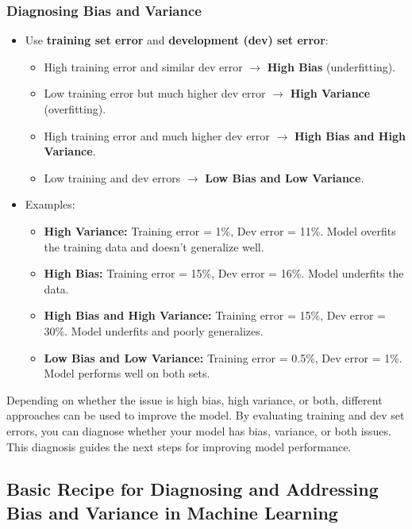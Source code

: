 \documentclass[letterpaper,12pt,notitlepage,twoside]{report}
\begin{document}
\subsubsection*{Diagnosing Bias and Variance}
\begin{itemize}[leftmargin=*]
    \item Use \textbf{training set error} and \textbf{development (dev) set error}:
    \begin{itemize}
        \item High training error and similar dev error $\rightarrow$ \textbf{High Bias} (underfitting).
        \item Low training error but much higher dev error $\rightarrow$ \textbf{High Variance} (overfitting).
        \item High training error and much higher dev error $\rightarrow$ \textbf{High Bias and High Variance}.
        \item Low training and dev errors $\rightarrow$ \textbf{Low Bias and Low Variance}.
    \end{itemize}
    \item Examples:
	\begin{itemize}
	    \item \textbf{High Variance:} Training error = 1\%, Dev error = 11\%. Model overfits the training data and doesn’t generalize well.
	    \item \textbf{High Bias:} Training error = 15\%, Dev error = 16\%. Model underfits the data.
	    \item \textbf{High Bias and High Variance:} Training error = 15\%, Dev error = 30\%. Model underfits and poorly generalizes.
	    \item \textbf{Low Bias and Low Variance:} Training error = 0.5\%, Dev error = 1\%. Model performs well on both sets.
	\end{itemize}
\end{itemize}

Depending on whether the issue is high bias, high variance, or both, different approaches can be used to improve the model. By evaluating training and dev set errors, you can diagnose whether your model has bias, variance, or both issues. This diagnosis guides the next steps for improving model performance.

\subsection{Basic Recipe for Diagnosing and Addressing Bias and Variance in Machine Learning}
\end{document}
